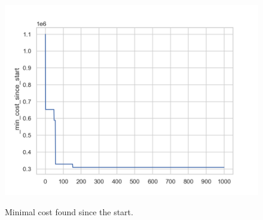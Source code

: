 \begin{figure}[h]
	\begin{centering}
		{\includegraphics[scale=0.6]{figures/experiments/1000_iter/min_cost_1000.png}}
		\caption[Minimal cost]{Minimal cost found since the start.}
		\label{fig:min_cost_1000}
	\end{centering}
\end{figure}
